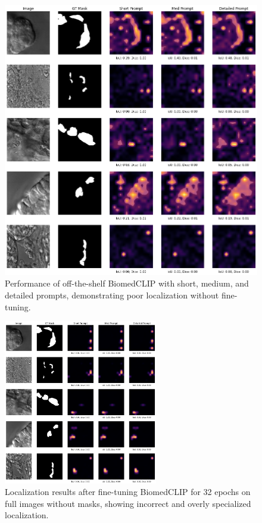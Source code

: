 \documentclass[./dissertation.tex]{subfiles}
\begin{document}
\begin{figure}
    \centering
    \includegraphics[width=\textwidth]{figures/sam/untuned short med long.png}
    \caption{Performance of off-the-shelf BiomedCLIP with short, medium, and detailed prompts, demonstrating poor localization without fine-tuning.}
    \label{fig:untuned_short_med_long}
\end{figure}

\begin{figure}
    \centering
    \includegraphics[width=0.6\textwidth]{figures/sam/fine-tuned no mask ep 32.png}
    \caption{Localization results after fine-tuning BiomedCLIP for 32 epochs on full images without masks, showing incorrect and overly specialized localization.}
    \label{fig:fine_tuned_no_mask_ep32}
\end{figure}
\end{document}
